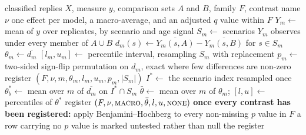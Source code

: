 \begin{algorithm}[H]
\caption[Estimation and Inference]{\textbf{Estimation and
Inference.} The scenario is the resampled unit throughout; each model carries
equal weight in the macro-average, and correction runs over a whole family after
every contrast has been registered.}
\label{alg:inference}
\footnotesize
\begin{algorithmic}[1]
\Require classified replies $X$, measure $y$, comparison sets $A$ and $B$, family $F$, contrast name $\nu$
\Ensure one effect per model, a macro-average, and an adjusted $q$ value within $F$
    \State $Y_m \gets$ mean of $y$ over replicates, by scenario and age signal
    \State $S_m \gets$ scenarios $Y_m$ observes under every member of $A \cup B$
    \State $d_m(s) \gets \overline{Y_m(s, A)} - \overline{Y_m(s, B)}$ for $s \in S_m$
    \State $\theta_m \gets \overline{d_m}$
    \State $[l_m, u_m] \gets$ percentile interval, resampling $S_m$ with replacement
    \State $p_m \gets$ two-sided sign-flip permutation on $d_m$, exact where few differences are non-zero
    \State register $(F, \nu, m, \theta_m, l_m, u_m, p_m, |S_m|)$
\EndFor
{}
    \State $I^{*} \gets$ the scenario index resampled once 
    \State $\theta^{*}_{b} \gets$ mean over $m$ of $\overline{d_m}$ on $I^{*} \cap S_m$
\EndFor
\State $\bar{\theta} \gets$ mean over $m$ of $\theta_m$; $[l, u] \gets$ percentiles of $\theta^{*}$
\State register $(F, \nu, \textsc{macro}, \bar{\theta}, l, u, \textsc{none})$
\Statex
\State \textbf{once every contrast has been registered:}
    \State apply Benjamini--Hochberg to every non-missing $p$ value in $F$ 
\EndFor
\State a row carrying no $p$ value is marked untested rather than null
\State \Return the register
\end{algorithmic}
\end{algorithm}